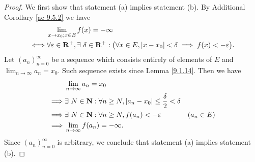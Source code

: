 \begin{proof}
    We first show that statement (a) implies statement (b).
    By Additional Corollary \ref{ac 9.5.2} we have
    \begin{align*}
             & \lim_{x \to x_0 ; x \in E} f(x) = -\infty                                                                                                                 \\
        \iff & \forall \varepsilon \in \mathbf{R}^+, \exists\ \delta \in \mathbf{R}^+ : \big(\forall x \in E, \abs*{x - x_0} < \delta \implies f(x) < -\varepsilon\big).
    \end{align*}
    Let \((a_n)_{n = 0}^\infty\) be a sequence which consists entirely of elements of \(E\) and \(\lim_{n \to \infty} a_n = x_0\).
    Such sequence exists since Lemma \ref{9.1.14}.
    Then we have
    \begin{align*}
                 & \lim_{n \to \infty} a_n = x_0                                                                               \\
        \implies & \exists\ N \in \mathbf{N} : \forall n \geq N, \abs*{a_n - x_0} \leq \frac{\delta}{2} < \delta               \\
        \implies & \exists\ N \in \mathbf{N} : \forall n \geq N, f(a_n) < -\varepsilon                           & (a_n \in E) \\
        \implies & \lim_{n \to \infty} f(a_n) = -\infty.
    \end{align*}
    Since \((a_n)_{n = 0}^\infty\) is arbitrary, we conclude that statement (a) implies statement (b).


\end{proof}
